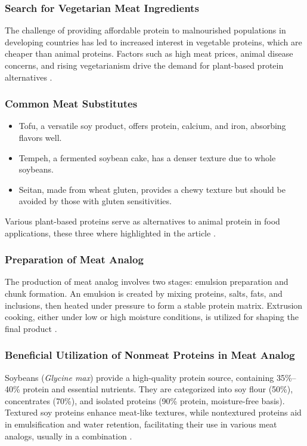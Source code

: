 \subsubsection*{Search for Vegetarian Meat Ingredients}
The challenge of providing affordable protein to malnourished populations in developing countries has led to increased interest in vegetable proteins, which are cheaper than animal proteins. Factors such as high meat prices, animal disease concerns, and rising vegetarianism drive the demand for plant-based protein alternatives \cite*{L12-MeatAna}.

\subsubsection*{Common Meat Substitutes}
\begin{itemize}
    \item Tofu, a versatile soy product, offers protein, calcium, and iron, absorbing flavors well.
    \item Tempeh, a fermented soybean cake, has a denser texture due to whole soybeans.
    \item Seitan, made from wheat gluten, provides a chewy texture but should be avoided by those with gluten sensitivities.
\end{itemize}

Various plant-based proteins serve as alternatives to animal protein in food applications, these three where highlighted in the article \cite*{L12-MeatAna}.

\subsubsection*{Preparation of Meat Analog}
The production of meat analog involves two stages: emulsion preparation and chunk formation. An emulsion is created by mixing proteins, salts, fats, and inclusions, then heated under pressure to form a stable protein matrix. Extrusion cooking, either under low or high moisture conditions, is utilized for shaping the final product \cite*{L12-MeatAna}.

\subsubsection*{Beneficial Utilization of Nonmeat Proteins in Meat Analog}
Soybeans (\textit{Glycine max}) provide a high-quality protein source, containing 35\%–40\% protein and essential nutrients. They are categorized into soy flour (50\%), concentrates (70\%), and isolated proteins (90\% protein, moisture-free basis). Textured soy proteins enhance meat-like textures, while nontextured proteins aid in emulsification and water retention, facilitating their use in various meat analogs, usually in a combination \cite*{L12-MeatAna}.

